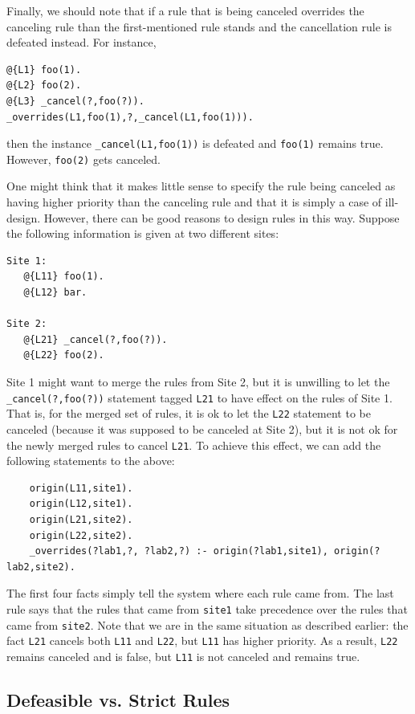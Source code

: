 \documentclass[11pt]{article}
\begin{document}
Finally, we should note that if a rule that is being canceled overrides
the canceling rule than the first-mentioned rule stands and the
cancellation rule is defeated instead. For instance,
\begin{verbatim}
@{L1} foo(1).
@{L2} foo(2).
@{L3} _cancel(?,foo(?)).  
_overrides(L1,foo(1),?,_cancel(L1,foo(1))).
\end{verbatim}
then the instance {\tt \_cancel(L1,foo(1))} is defeated and {\tt foo(1)}
remains true. However, {\tt foo(2)} gets canceled.

One might think that it makes little sense to specify the rule being
canceled as having higher priority than the canceling rule and that it is
simply a case of ill-design. However, there can be good reasons to design
rules in this way. Suppose the following information is given at two different sites:
\begin{verbatim}
Site 1:
   @{L11} foo(1).
   @{L12} bar.

Site 2:
   @{L21} _cancel(?,foo(?)).  
   @{L22} foo(2).
\end{verbatim}
Site 1 might want to merge the rules from Site 2, but it is unwilling to
let the {\tt \_cancel(?,foo(?))} statement tagged {\tt L21} to have effect
on the rules of Site 1. That is, for the merged set of rules, it is ok to
let the {\tt L22} statement to be canceled (because it was supposed to be
canceled at Site 2), but it is not ok for the newly merged rules to cancel
{\tt L21}. To achieve this effect, we can add the following statements to
the above:
\begin{verbatim}
    origin(L11,site1).
    origin(L12,site1).
    origin(L21,site2).
    origin(L22,site2).
    _overrides(?lab1,?, ?lab2,?) :- origin(?lab1,site1), origin(?lab2,site2).
\end{verbatim}
The first four facts simply tell the system where each rule came from.  The
last rule says that the rules that came from {\tt site1} take precedence
over the rules that came from {\tt site2}.  Note that we are in the same
situation as described earlier: the fact {\tt L21} cancels both {\tt L11}
and {\tt L22}, but {\tt L11} has higher priority. As a result, {\tt L22}
remains canceled and is false, but {\tt L11} is not canceled and remains
true.

\subsection{Defeasible vs. Strict Rules}
\end{document}

